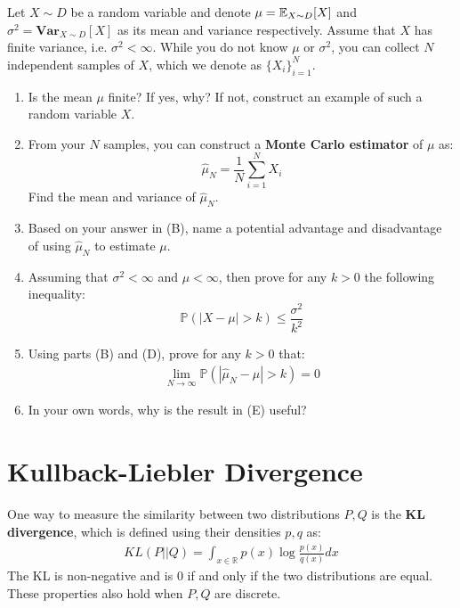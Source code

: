 \documentclass[11pt]{article}
\begin{document}
Let $X \sim D$ be a random variable and denote $\mu = \mathbb{E}_{X \sim D}[X]$ and $\sigma^2 = \mathbf{Var}_{X\sim D}[X]$ as its mean and variance respectively. Assume that $X$ has finite variance, i.e. $\sigma^2 < \infty$. While you do not know $\mu$ or $\sigma^2$, you can collect $N$ independent samples of $X$, which we denote as $\{X_i\}_{i=1}^N$.
      \begin{enumerate}[label=(\Alph*)]
      
            \item Is the mean $\mu$ finite? If yes, why? If not, construct an example of such a random variable $X$.\\
            

            \item From your $N$ samples, you can construct a \textbf{Monte Carlo estimator} of $\mu$ as:
            $$\hat{\mu}_N = \frac{1}{N} \sum_{i=1}^{N} X_i$$
            Find the mean and variance of $\hat{\mu}_N$. \\
            
            \item Based on your answer in (B), name a potential advantage and disadvantage of using $\hat{\mu}_N$ to estimate $\mu$. 

                     
            \item Assuming that $\sigma^2<\infty$ and $\mu < \infty$, then prove for any $k > 0$ the following inequality:
            \[ \mathbb{P}(|X - \mu| > k) \leq \frac{\sigma^2}{k^2} \]
            

        
        \item Using parts (B) and (D), prove for any $k > 0$ that:
            \begin{align*}
                \lim_{N \rightarrow \infty} \mathbb{P}(|\hat{\mu}_N - \mu| > k) = 0
            \end{align*}
            
        \item In your own words, why is the result in (E) useful?
         

\end{enumerate}

\newpage 

    
\section{Kullback-Liebler Divergence}
    
One way to measure the similarity between two distributions $P,Q$ is the \textbf{KL divergence}, which is defined using their densities $p,q$ as:
\begin{align*}
    KL(P || Q) = \int_{x \in \mathbb{R}} p(x) \log \frac{p(x)}{q(x)} dx
\end{align*}
The KL is non-negative and is $0$ if and only if the two distributions are equal. These properties also hold when $P,Q$ are discrete.\\
\end{document}
